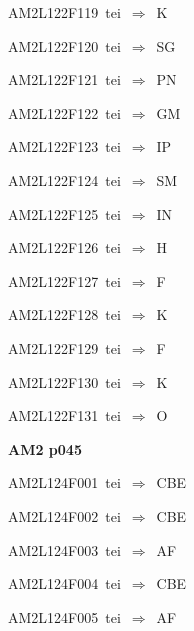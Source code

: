 {\sixrm AM2L122F119\ {\sixit tei}\ }$\Rightarrow$\ K\par\smallskip
{\sixrm AM2L122F120\ {\sixit tei}\ }$\Rightarrow$\ SG\par\smallskip
{\sixrm AM2L122F121\ {\sixit tei}\ }$\Rightarrow$\ PN\par\smallskip
{\sixrm AM2L122F122\ {\sixit tei}\ }$\Rightarrow$\ GM\par\smallskip
{\sixrm AM2L122F123\ {\sixit tei}\ }$\Rightarrow$\ IP\par\smallskip
{\sixrm AM2L122F124\ {\sixit tei}\ }$\Rightarrow$\ SM\par\smallskip
{\sixrm AM2L122F125\ {\sixit tei}\ }$\Rightarrow$\ IN\par\smallskip
{\sixrm AM2L122F126\ {\sixit tei}\ }$\Rightarrow$\ H\par\smallskip
{\sixrm AM2L122F127\ {\sixit tei}\ }$\Rightarrow$\ F\par\smallskip
{\sixrm AM2L122F128\ {\sixit tei}\ }$\Rightarrow$\ K\par\smallskip
{\sixrm AM2L122F129\ {\sixit tei}\ }$\Rightarrow$\ F\par\smallskip
{\sixrm AM2L122F130\ {\sixit tei}\ }$\Rightarrow$\ K\par\smallskip
{\sixrm AM2L122F131\ {\sixit tei}\ }$\Rightarrow$\ O\par\smallskip

\par\vfill\eject
{\bf\hfill AM2 p045\hfill\hbox{}}\par\bigskip
{\sixrm AM2L124F001\ {\sixit tei}\ }$\Rightarrow$\ CBE\par\smallskip
{\sixrm AM2L124F002\ {\sixit tei}\ }$\Rightarrow$\ CBE\par\smallskip
{\sixrm AM2L124F003\ {\sixit tei}\ }$\Rightarrow$\ AF\par\smallskip
{\sixrm AM2L124F004\ {\sixit tei}\ }$\Rightarrow$\ CBE\par\smallskip
{\sixrm AM2L124F005\ {\sixit tei}\ }$\Rightarrow$\ AF\par\smallskip

